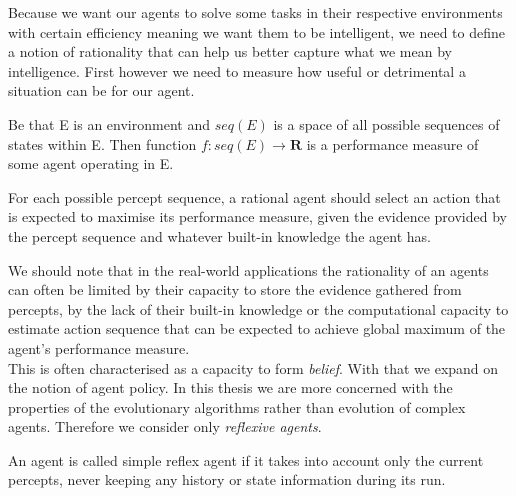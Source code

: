 Because we want our agents to solve some tasks in their respective environments with certain efficiency meaning we want them to be intelligent, we need to define a notion of rationality that can help us better capture what we mean by intelligence. First however we need to measure how useful or detrimental a situation can be for our agent.
\begin{defn}
Be that E is an environment and  $ seq(E) $ is a space of all possible sequences of states within E.
Then function $ f: seq(E)\rightarrow \textbf{R} $ is a performance measure of some agent operating in E.
\end{defn}
\begin{defn}
For each possible percept sequence, a rational agent should select an action that is expected to maximise its performance measure, given the evidence provided by the percept sequence and whatever built-in knowledge the agent has.
\end{defn}
We should note that in the real-world applications the rationality of an agents can often be limited by their capacity to store the evidence gathered from percepts, by the lack of their built-in knowledge or the computational capacity to estimate action sequence that can be expected to achieve global maximum of the agent's performance measure. \\
This is often characterised as a capacity to form  \textit{belief}. With that we expand on the notion of agent policy. 
In this thesis we are more concerned with the properties of the evolutionary algorithms rather than evolution of complex agents. Therefore we consider only \textit{reflexive agents}.
\begin{defn}
An agent is called simple reflex agent if it takes into account only the current percepts, never keeping any history or state information during its run.
\end{defn}

